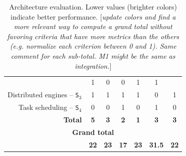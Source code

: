 \documentclass[preprint,3p,twocolumn]{elsarticle}
\newcommand{\todo}[1]{\color{blue}\xspace[\emph{#1}]\xspace\color{black}}
\begin{document}
\begin{table}
\begin{tabular}{rcccccc}
                                     & \cellcolor[HTML]{99DD99}1
                                     & \cellcolor[HTML]{99FF99}0
                                     & \cellcolor[HTML]{99FF99}0
                                     & \cellcolor[HTML]{99DD99}1
                                     & \cellcolor[HTML]{99DD99}1 \\
Distributed engines -- \texttt{S$_3$}& \cellcolor[HTML]{99AA99}1
                                     & \cellcolor[HTML]{99AA99}1
                                     & \cellcolor[HTML]{99AA99}1
                                     & \cellcolor[HTML]{99AA99}1
                                     & \cellcolor[HTML]{99FF99}0
                                     & \cellcolor[HTML]{99AA99}1 \\
Task scheduling -- \texttt{S$_4$}    & \cellcolor[HTML]{99FF99}0
                                     & \cellcolor[HTML]{99FF99}0
                                     & \cellcolor[HTML]{99AA99}1
                                     & \cellcolor[HTML]{99FF99}0
                                     & \cellcolor[HTML]{99FF99}1
                                     & \cellcolor[HTML]{99FF99}0 \\
\textbf{Total}                       & \cellcolor[HTML]{99AA99}\textbf{5}
                                     & \cellcolor[HTML]{99BB99}\textbf{3}
                                     & \cellcolor[HTML]{99DD99}\textbf{2}
                                     & \cellcolor[HTML]{99FF99}\textbf{1}
                                     & \cellcolor[HTML]{99DD99}\textbf{3}
                                     & \cellcolor[HTML]{99BB99}\textbf{3} \\
\multicolumn{7}{c}{\cellcolor[HTML]{EEEEEE}\textbf{Grand total}}\\
                                     & \cellcolor[HTML]{99CC99}\textbf{22}
                                     & \cellcolor[HTML]{99BB99}\textbf{23}
                                     & \cellcolor[HTML]{99FF99}\textbf{17}
                                     & \cellcolor[HTML]{99CC99}\textbf{23}
                                     & \cellcolor[HTML]{99DD99}\textbf{31.5}
                                     & \cellcolor[HTML]{99AA99}\textbf{22}
\end{tabular}
\caption{Architecture evaluation. Lower values (brighter colors) indicate better performance. \todo{update colors and find a more relevant way to compute a grand total without favoring criteria that have more metrics than the others (e.g. normalize each criterion between 0 and 1). Same comment for each sub-total. M1 might be the same as integration.}}
\label{table:evaluation}
\end{table}
\end{document}
